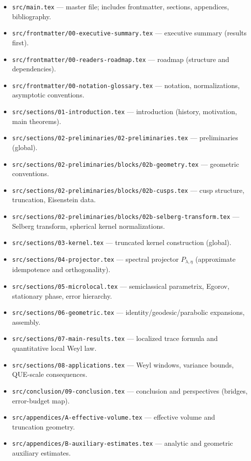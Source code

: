 \begin{itemize}
  \item \texttt{src/main.tex} — master file; includes frontmatter, sections, appendices, bibliography.
  \item \texttt{src/frontmatter/00-executive-summary.tex} — executive summary (results first).
  \item \texttt{src/frontmatter/00-readers-roadmap.tex} — roadmap (structure and dependencies).
  \item \texttt{src/frontmatter/00-notation-glossary.tex} — notation, normalizations, asymptotic conventions.
  \item \texttt{src/sections/01-introduction.tex} — introduction (history, motivation, main theorems).
  \item \texttt{src/sections/02-preliminaries/02-preliminaries.tex} — preliminaries (global).
  \item \texttt{src/sections/02-preliminaries/blocks/02b-geometry.tex} — geometric conventions.
  \item \texttt{src/sections/02-preliminaries/blocks/02b-cusps.tex} — cusp structure, truncation, Eisenstein data.
  \item \texttt{src/sections/02-preliminaries/blocks/02b-selberg-transform.tex} — Selberg transform, spherical kernel normalizations.
  \item \texttt{src/sections/03-kernel.tex} — truncated kernel construction (global).
  \item \texttt{src/sections/04-projector.tex} — spectral projector $P_{\lambda,\eta}$ (approximate idempotence and orthogonality).
  \item \texttt{src/sections/05-microlocal.tex} — semiclassical parametrix, Egorov, stationary phase, error hierarchy.
  \item \texttt{src/sections/06-geometric.tex} — identity/geodesic/parabolic expansions, assembly.
  \item \texttt{src/sections/07-main-results.tex} — localized trace formula and quantitative local Weyl law.
  \item \texttt{src/sections/08-applications.tex} — Weyl windows, variance bounds, QUE-scale consequences.
  \item \texttt{src/conclusion/09-conclusion.tex} — conclusion and perspectives (bridges, error-budget map).
  \item \texttt{src/appendices/A-effective-volume.tex} — effective volume and truncation geometry.
  \item \texttt{src/appendices/B-auxiliary-estimates.tex} — analytic and geometric auxiliary estimates.

\end{itemize}
